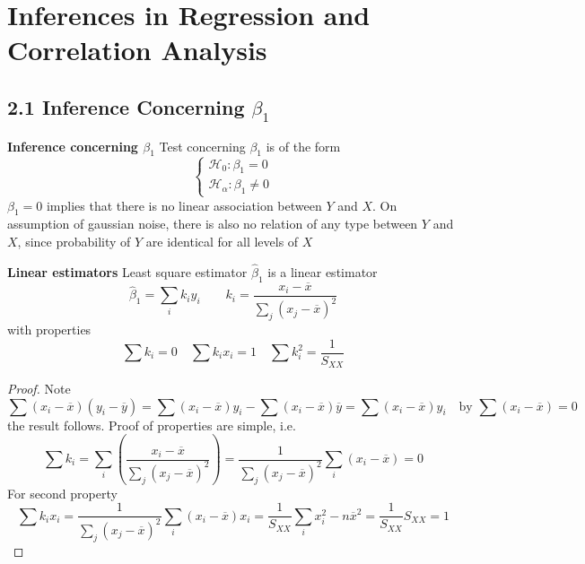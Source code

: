 \documentclass[11pt]{article}
\begin{document}
\section*{Inferences in Regression and Correlation Analysis}


\subsection*{2.1 Inference Concerning $\beta_1$}


\begin{defn*}
	\textbf{Inference concerning $\beta_1$} Test concerning $\beta_1$ is of the form 
	\[
		\begin{cases*}
			\mathcal{H}_0: \beta_1 = 0\\
			\mathcal{H}_{\alpha}: \beta_1 \neq 0  
		\end{cases*}
	\]
	$\beta_1 = 0$ implies that there is no linear association between $Y$ and $X$. On assumption of gaussian noise, there is also no relation of any type between $Y$ and $X$, since probability of $Y$ are identical for all levels of $X$ 
\end{defn*} 


\begin{defn*}
	\textbf{Linear estimators} Least square estimator $\hat{\beta}_1$ is a linear estimator
	\[
		\hat{\beta}_1 = \sum_i k_i y_i \quad \quad k_i = \frac{x_i -\overline{x}}{\sum_j (x_j - \overline{x})^2}
	\]
	with properties
	\[
		\sum k_i = 0 \quad \sum k_i x_i = 1 \quad \sum k_i^2 = \frac{1}{S_{XX}}
	\]
	\begin{proof}
		Note
		\[
			\sum (x_i - \overline{x})(y_i - \overline{y}) = \sum (x_i - \overline{x})y_i - \sum (x_i - \overline{x})\overline{y} = \sum (x_i - \overline{x})y_i \quad \text{by $\sum (x_i - \overline{x}) = 0$}
		\]
		the result follows. Proof of properties are simple, i.e.
		\[
			\sum k_i = \sum_i \left( \frac{x_i - \overline{x}}{\sum_j (x_j - \overline{x})^2} \right) 
			= \frac{1}{\sum_j (x_j - \overline{x})^2} \sum_i (x_i - \overline{x}) = 0
		\]
		For second property
		\[
			\sum k_i x_i 
			= \frac{1}{\sum_j (x_j - \overline{x})^2} \sum_i (x_i - \overline{x}) x_i 
			= \frac{1}{S_{XX}} \sum_i x_i^2 - n\overline{x}^2
			= \frac{1}{S_{XX}} S_{XX}
			= 1
		\] 
	\end{proof}
\end{defn*}
\end{document}
